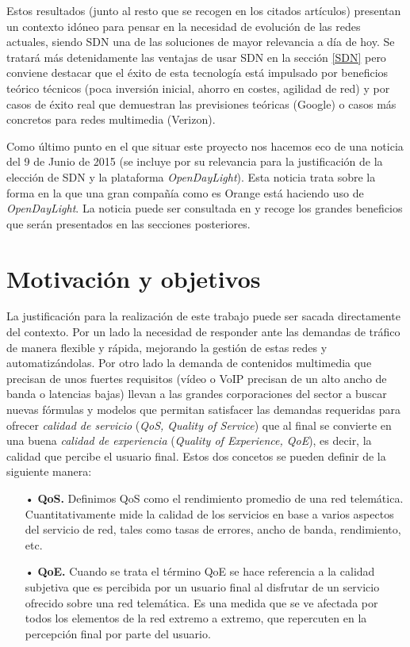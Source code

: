 \documentclass[a4paper,11pt]{book}
\begin{document}
Estos resultados (junto al resto que se recogen en los citados artículos) presentan un contexto idóneo para pensar en la necesidad de evolución de las redes actuales, siendo \ac{SDN} una de las soluciones de mayor relevancia a día de hoy. Se tratará más detenidamente las ventajas de usar \ac{SDN} en la sección \ref{SDN} pero conviene destacar que el éxito de esta tecnología está impulsado por beneficios teórico técnicos (poca inversión inicial, ahorro en costes, agilidad de red) y por casos de éxito real que demuestran las previsiones teóricas (Google\cite{googleOpenFlow}) o casos más concretos para redes multimedia (Verizon\cite{verizonSDN}).

Como último punto en el que situar este proyecto nos hacemos eco de una noticia del 9 de Junio de 2015 (se incluye por su relevancia para la justificación de la elección de \ac{SDN} y la plataforma \emph{OpenDayLight}). Esta noticia trata sobre la forma en la que una gran compañía como es Orange está haciendo uso de \emph{OpenDayLight}. La noticia puede ser consultada en \cite{orangeSDN} y recoge los grandes beneficios que serán presentados en las secciones posteriores. 

%
\section{Motivación y objetivos}
La justificación para la realización de este trabajo puede ser sacada directamente del contexto. Por un lado la necesidad de responder ante las demandas de tráfico de manera flexible y rápida, mejorando la gestión de estas redes y automatizándolas. Por otro lado la demanda de contenidos multimedia que precisan de unos fuertes requisitos (vídeo o \ac{VoIP} precisan de un alto ancho de banda o latencias bajas) llevan a las grandes corporaciones del sector a buscar nuevas fórmulas y modelos que permitan satisfacer las demandas requeridas para ofrecer \emph{calidad de servicio} (\emph{QoS, Quality of Service}) que al final se convierte en una buena \emph{calidad de experiencia} (\emph{Quality of Experience, QoE}), es decir, la calidad que percibe el usuario final. Estos dos concetos se pueden definir de la siguiente manera:

\begin{itemize}
\item[•] \textbf{\ac{QoS}.} Definimos \ac{QoS} como el rendimiento promedio de una red telemática. Cuantitativamente mide la calidad de los servicios en base a varios aspectos del servicio de red, tales como tasas de errores, ancho de banda, rendimiento, etc.
\item[•] \textbf{\ac{QoE}.} Cuando se trata el término \ac{QoE} se hace referencia a la calidad subjetiva que es percibida por un usuario final al disfrutar de un servicio ofrecido sobre una red telemática. Es una medida que se ve afectada por todos los elementos de la red extremo a extremo, que repercuten en la percepción final por parte del usuario.
\end{itemize}
\end{document}
